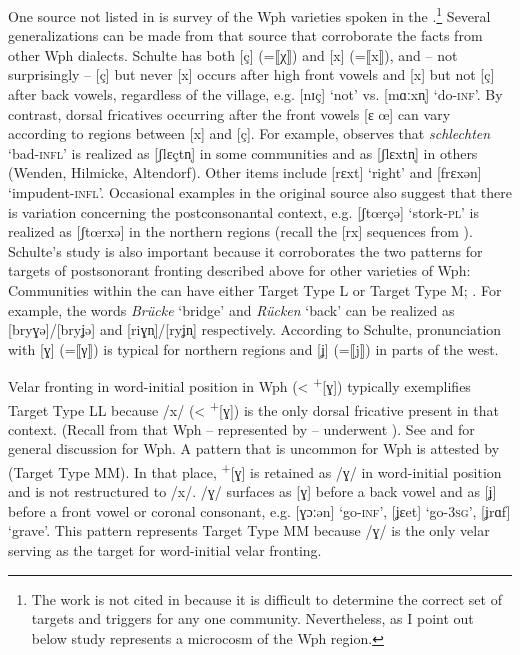 One source not listed in  is  survey of the Wph varieties spoken in the .\footnote{{The work is not cited in  because it is difficult to determine the correct set of targets and triggers for any one community. Nevertheless, as I point out below  study represents a microcosm of the Wph region.} } Several generalizations can be made from that source that corroborate the facts from other Wph dialects. Schulte has both [ç] (=⟦χ⟧) and [x] (=⟦x⟧), and -- not surprisingly -- [ç] but never [x] occurs after high front vowels and [x] but not [ç] after back vowels, regardless of the village, e.g. [nɪç] ‘not’ vs. [mɑːxn̩] ‘do\textsc{{}-inf}’. By contrast, dorsal fricatives occurring after the front vowels [ɛ œ] can vary according to regions between [x] and [ç]. For example, \citet[26]{Schulte1941} observes that \textit{schlechten} ‘bad\textsc{{}-infl}’ is realized as [ʃlɛçtn̩] in some communities and as [ʃlɛxtn̩] in others (Wenden, Hilmicke, Altendorf). Other items include [rɛxt] ‘right’ and [frɛxən] ‘impudent\textsc{{}-infl}’. Occasional examples in the original source also suggest that there is variation concerning the postconsonantal context, e.g. [ʃtœrçə] ‘stork-\textsc{pl}’ is realized as [ʃtœrxə] in the northern regions (recall the [rx] sequences from ). Schulte’s study is also important because it corroborates the two patterns for targets of postsonorant fronting described above for other varieties of Wph: Communities within the  can have either Target Type L or Target Type M; \citet[61-62]{Schulte1941}. For example, the words \textit{Brücke} ‘bridge’ and \textit{Rücken} ‘back’ can be realized as [bryɣə]/[bryʝə] and [riɣn̩]/[ryʝn̩] respectively. According to Schulte, pronunciation with [ɣ] (=⟦γ⟧) is typical for northern regions and [ʝ] (=⟦j⟧) in parts of the west.

Velar fronting in word-initial position in Wph (< \textsuperscript{+}[ɣ]) typically exemplifies Target Type LL because /x/ (< \textsuperscript{+}[ɣ]) is the only dorsal fricative present in that context. (Recall from  that Wph -- represented by  -- underwent ). See \citet[66]{Jellinghaus77} and \citet[44--46]{Niebaum1977} for general discussion for Wph. A pattern that is uncommon for Wph is attested by  (Target Type MM). In that place,  \textsuperscript{+}[ɣ] is retained as /ɣ/ in word-initial position and is not restructured to /x/. /ɣ/ surfaces as [ɣ] before a back vowel and as [ʝ] before a front vowel or coronal consonant, e.g. [ɣɔːən] ‘go\textsc{{}-inf}’, [ʝɛet] ‘go\textsc{{}-3sg}’, [ʝrɑf] ‘grave’. This pattern represents Target Type MM because /ɣ/ is the only velar serving as the target for word-initial velar fronting.

